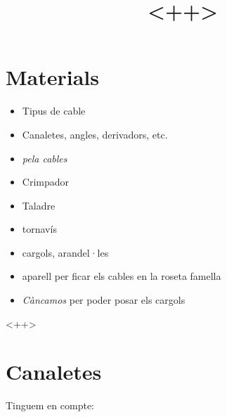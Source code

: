 \documentclass[a4paper]{article}
\begin{document}
\title{<++>}
\maketitle


%

\begin{comment}
oddsidemargin \the\oddsidemargin \newline
textwidth \the\textwidth \newline
marginparsep \the\marginparsep \newline
marginparwidth \the\marginparwidth \newline
hoffset \the\hoffset \newline
paperwidth \the\paperwidth 
\end{comment}

\section{Materials}

\begin{itemize}
	\item Tipus de cable
	\item Canaletes, angles, derivadors, etc.
	\item \textit{pela cables}
	\item Crimpador
	\item Taladre
	\item tornavís
	\item cargols, arandel·les
	\item aparell per ficar els cables en la roseta famella
	\item \textit{Càncamos} per poder posar els cargols
\end{itemize}<++>

\section{Canaletes}
Tinguem en compte:
\end{document}
